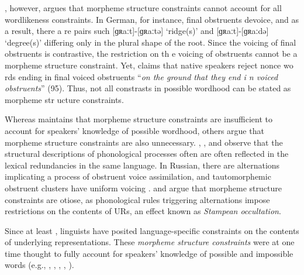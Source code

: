 \citet{Shibatani1973}, however, argues that morpheme structure constraints cannot account for all wordlikeness constraints.
In German, for instance, final obstruents devoice, and as a result, there a
re pairs such  [ɡʀaːt]-[ɡʀaːtə] `ridge(s)' and [ɡʀaːt]-[ɡʀaːdə] `degree(s)'
 differing only in the plural shape of the root.
Since the voicing of final obstruents is contrastive, the restriction on th
e voicing of obstruents cannot be a morpheme structure constraint. 
Yet, \citeauthor{Shibatani1973} claims that native speakers reject nonce wo
rds ending in final voiced obstruents ``\emph{on the ground that they end i
n voiced obstruents}'' (95). 
Thus, not all constrasts in possible wordhood can be stated as morpheme str
ucture constraints.

Whereas \citeauthor{Shibatani1973} maintains that morpheme structure constraints are insufficient to account for speakers' knowledge of possible wordhood, others argue that morpheme structure constraints are also unnecessary. \citet[297]{Hale1965}, \citet{Kisseberth1970b}, and \citet[212f.]{Postal1968} observe that the structural descriptions of phonological processes often are often reflected in the lexical redundancies in the same language. In Russian, there are alternations implicating a process of obstruent voice assimilation, and tautomorphemic obstruent clusters have uniform voicing \citep[283]{A74}. \citet[205f.]{Dell1973} and \citet[28f.]{Stampe1973} argue that morpheme structure constraints are otiose, as phonological rules triggering alternations impose restrictions on the contents of URs, an effect known as \emph{Stampean occultation}.

Since at least \citet{Pike1947b}, linguists have posited language-specific constraints on the contents of underlying representations.
These \emph{morpheme structure constraints} were at one time thought to fully account for speakers' knowledge of possible and impossible words (e.g., \citealt{Chomsky1965}, \citeyear[382]{SPE}, \citealt[22f.]{SPR}, \citeyear{
Halle1962}, \citealt{Stanley1967}).
